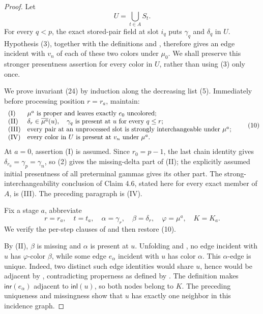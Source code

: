 \begin{proof}
Let
\[
 U=\bigcup_{t\in A}S_t.                                      \tag{9}
\]
For every \(q<p\), the exact stored-pair field at slot \(i_q\) puts
\(\gamma_q\) and \(\delta_q\) in \(U\).  Hypothesis (3), together
with the definitions  and
, therefore gives an edge incident with \(v_n\)
of each of these two colors under \(\mu_0\).  We shall preserve this
stronger presentness assertion for every color in \(U\), rather than
using (3) only once.

We prove invariant (24) by induction along the decreasing list (5).
Immediately before processing position \(r=r_a\), maintain:
\[
\begin{array}{ll}
({\rm I})&\mu^a\text{ is proper and leaves exactly }e_0
          \text{ uncolored};\\
({\rm II})&\delta_r\in\overline{\mu^a}(u),\quad
          \gamma_q\text{ is present at }u\text{ for every }q\leq r;\\
({\rm III})&\text{every pair at an unprocessed slot is strongly
          interchangeable under }\mu^a;\\
({\rm IV})&\text{every color in }U\text{ is present at }v_n
          \text{ under }\mu^a.
\end{array}                                                    \tag{10}
\]
At \(a=0\), assertion (I) is assumed.  Since \(r_0=p-1\), the last
chain identity gives
\(\delta_{r_0}=\gamma_p=\gamma_n\), so (2) gives the missing-delta
part of (II); the explicitly assumed initial presentness of all
preterminal gammas gives its other part.  The strong-interchangeability
conclusion of Claim 4.6, stated here for every exact member of \(A\), is
(III).  The preceding paragraph is (IV).

Fix a stage \(a\), abbreviate
\[
 r=r_a,\quad t=t_a,\quad \alpha=\gamma_r,\quad
 \beta=\delta_r,\quad \varphi=\mu^a,\quad K=K_a.             \tag{11}
\]
We verify the per-step clauses of
 and then restore (10).

By (II), \(\beta\) is missing and \(\alpha\) is present at \(u\).
Unfolding  and , no edge
incident with \(u\) has \(\varphi\)-color \(\beta\), while some edge
\(e_\alpha\) incident with \(u\) has color \(\alpha\).  This
\(\alpha\)-edge is unique.  Indeed, two distinct such edge identities
would share \(u\), hence would be adjacent by ,
contradicting properness as defined by
.  The definition
 makes
\(\mathsf{inr}(e_\alpha)\) adjacent to \(\mathsf{inl}(u)\), so both
nodes belong to \(K\).  The preceding uniqueness and missingness show
that \(u\) has exactly one neighbor in this incidence graph.


\end{proof}
